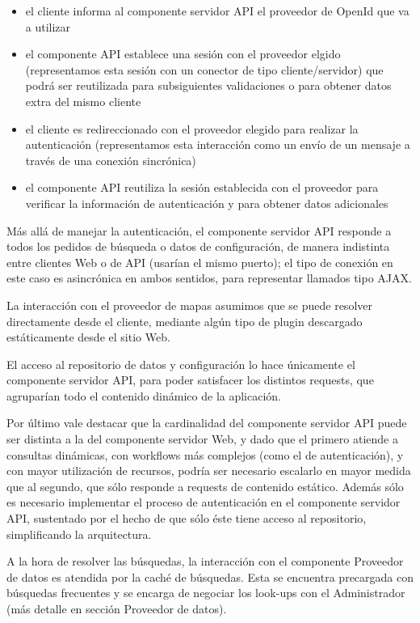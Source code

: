 \begin{itemize}
\item el cliente informa al componente servidor API el proveedor de OpenId que va a utilizar
\item el componente API establece una sesi\'on con el proveedor elgido (representamos esta sesi\'on con un conector de tipo cliente/servidor) que podr\'a ser reutilizada para subsiguientes validaciones o para obtener datos extra del mismo cliente
\item el cliente es redireccionado con el proveedor elegido para realizar la autenticaci\'on (representamos esta interacci\'on como un env\'io de un mensaje a trav\'es de una conexi\'on sincr\'onica)
\item el componente API reutiliza la sesi\'on establecida con el proveedor para verificar la informaci\'on de autenticaci\'on y para obtener datos adicionales
\end{itemize}

M\'as all\'a de manejar la autenticaci\'on, el componente servidor API responde a todos los pedidos de b\'usqueda o datos de configuraci\'on, de manera indistinta entre clientes Web o de API (usar\'ian el mismo puerto); el tipo de conexi\'on en este caso es asincr\'onica en ambos sentidos, para representar llamados tipo AJAX.

La interacci\'on con el proveedor de mapas asumimos que se puede resolver directamente desde el cliente, mediante alg\'un tipo de plugin descargado est\'aticamente desde el sitio Web.

El acceso al repositorio de datos y configuraci\'on lo hace \'unicamente el componente servidor API, para poder satisfacer los distintos requests, que agrupar\'ian todo el contenido din\'amico de la aplicaci\'on.

Por \'ultimo vale destacar que la cardinalidad del componente servidor API puede ser distinta a la del componente servidor Web, y dado que el primero atiende a consultas din\'amicas, con workflows m\'as complejos (como el de autenticaci\'on), y con mayor utilizaci\'on de recursos, podr\'ia ser necesario escalarlo en mayor medida que al segundo, que s\'olo responde a requests de contenido est\'atico. Adem\'as s\'olo es necesario implementar el proceso de autenticaci\'on en el componente servidor API, sustentado por el hecho de que s\'olo \'este tiene acceso al repositorio, simplificando la arquitectura.

A la hora de resolver las b\'usquedas, la interacci\'on con el componente Proveedor de datos es atendida por la cach\'e de b\'usquedas. Esta se encuentra precargada con b\'usquedas frecuentes y se encarga de negociar los look-ups con el Administrador (m\'as detalle en secci\'on Proveedor de datos).


